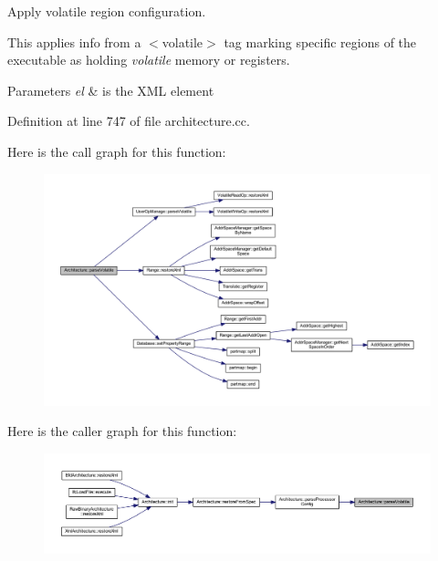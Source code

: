 Apply volatile region configuration. 

This applies info from a $<$volatile$>$ tag marking specific regions of the executable as holding {\itshape volatile} memory or registers. 
\begin{DoxyParams}{Parameters}
{\em el} & is the X\+ML element \\
\hline
\end{DoxyParams}


Definition at line 747 of file architecture.\+cc.

Here is the call graph for this function\+:
\nopagebreak
\begin{figure}[H]
\begin{center}
\leavevmode
\includegraphics[width=350pt]{class_architecture_a90175b3753d44c818064e08425c57d97_cgraph}
\end{center}
\end{figure}
Here is the caller graph for this function\+:
\nopagebreak
\begin{figure}[H]
\begin{center}
\leavevmode
\includegraphics[width=350pt]{class_architecture_a90175b3753d44c818064e08425c57d97_icgraph}
\end{center}
\end{figure}
\mbox{\label{class_architecture_a7cee782dabf4362f10a0bbb4c950f85e}} 
